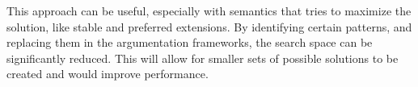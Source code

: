 This approach can be useful, especially with semantics that tries to maximize the solution, like stable and preferred extensions. By identifying certain patterns, and replacing them in the argumentation frameworks, the search space can be significantly reduced. This will allow for smaller sets of possible solutions to be created and would improve performance. 